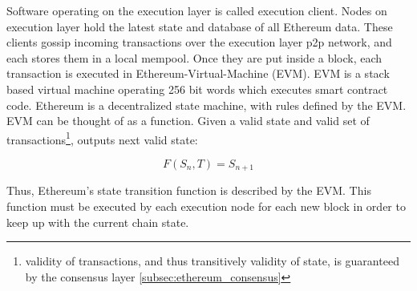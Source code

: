 Software operating on the execution layer is called execution client. Nodes on
execution layer hold the latest state and database of all Ethereum data. These
clients gossip incoming transactions over the execution layer p2p network, and
each stores them in a local mempool. Once they are put inside a block, each
transaction is executed in Ethereum-Virtual-Machine (EVM). EVM is a stack based
virtual machine operating 256 bit words which executes smart contract code.
Ethereum is a decentralized state machine, with rules defined by the EVM.
EVM can be thought of as a function. Given a valid state and valid set of
transactions\footnote{validity of transactions, and thus transitively validity
of state, is guaranteed by the consensus layer \ref{subsec:ethereum_consensus}},
outputs next valid state:

\[
	F(S_n, T) = S_{n+1} \label{eq:state_transition}
\]

Thus, Ethereum's state transition function is described by the EVM. This function
must be executed by each execution node for each new block in order to keep up
with the current chain state. \cite{ethereumEthereumVirtual}


